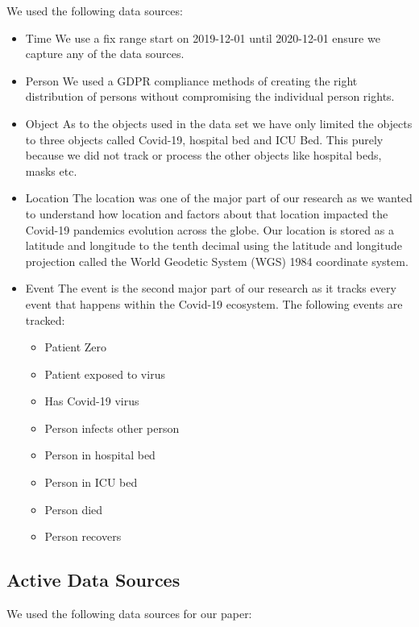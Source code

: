 We used the following data sources:
\begin{itemize}
    \item Time
    We use a fix range start on 2019-12-01 until 2020-12-01 ensure we capture any of the data sources.
    \item Person
    We used a GDPR \cite{EU2017} compliance methods of creating the right distribution of persons without compromising the individual person rights.
    \item Object
    As to the objects used in the data set we have only limited the objects to three objects called Covid-19, hospital bed and ICU Bed. This purely because we did not track or process the other objects like hospital beds, masks etc. %
    \item Location
    The location was one of the major part of our research as we wanted to understand how location and factors about that location impacted the Covid-19 pandemics evolution across the globe. Our location is stored as a latitude and longitude to the tenth decimal using the latitude and longitude projection called the World Geodetic System (WGS) 1984 coordinate system.
    \item Event
    The event is the second major part of our research as it tracks every event that happens within the Covid-19 ecosystem.
    The following events are tracked:
    \begin{itemize}
        \item Patient Zero
        \item Patient exposed to virus
        \item Has Covid-19 virus
        \item Person infects other person
        \item Person in hospital bed
        \item Person in ICU bed
        \item Person died
        \item Person recovers
    \end{itemize}
\end{itemize}

\subsection{Active Data Sources}

We used the following data sources for our paper:

